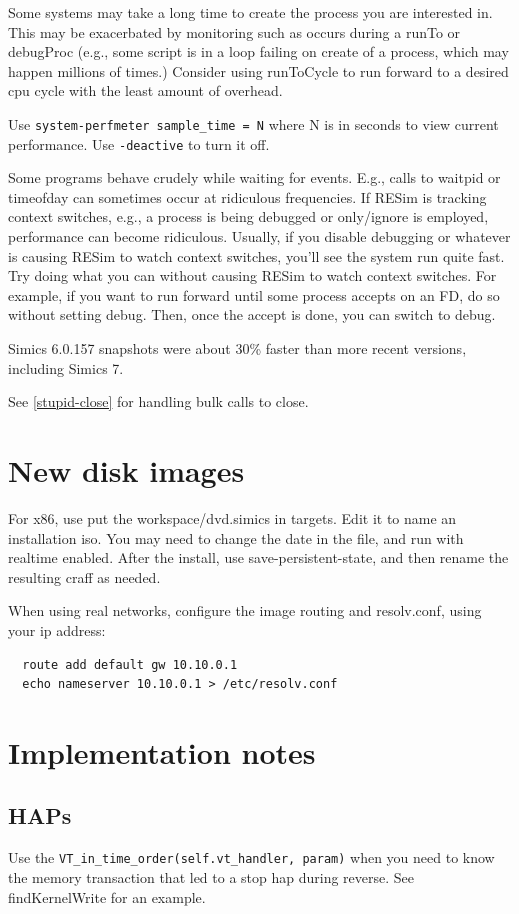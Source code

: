 \documentclass[titlepage]{article}
\begin{document}
\begin{appendices}
Some systems may take a long time to create the process you are interested in.  This may be exacerbated by monitoring such as occurs during
a runTo or debugProc (e.g., some script is in a loop failing on create of a process, which may happen millions of times.)  Consider using
runToCycle to run forward to a desired cpu cycle with the least amount of overhead.

Use {\tt system-perfmeter sample\_time = N} where N is in seconds to view current performance.  Use {\tt -deactive} to turn it off.

Some programs behave crudely while waiting for events.  E.g., calls to waitpid or timeofday can sometimes occur at ridiculous frequencies.
If RESim is tracking context switches, e.g., a process is being debugged or only/ignore is employed, performance can become ridiculous.
Usually, if you disable debugging or whatever is causing RESim to watch context switches, you'll see the system run quite fast.
Try doing what you can without causing RESim to watch context switches.  For example, if you want to run forward until some process accepts
on an FD, do so without setting debug.  Then, once the accept is done, you can switch to debug.

Simics 6.0.157 snapshots were about 30\% faster than more recent versions, including Simics 7.

See \ref{stupid-close} for handling bulk calls to close.

\section{New disk images}
For x86, use put the workspace/dvd.simics in targets.  Edit it to name an installation iso.  You may need to change the date in
the file, and run with realtime enabled.  After the install, use save-persistent-state, and then rename the resulting craff as
needed.

When using real networks, configure the image routing and resolv.conf, using your ip address:
\begin{verbatim}
  route add default gw 10.10.0.1
  echo nameserver 10.10.0.1 > /etc/resolv.conf
\end{verbatim}


\section{Implementation notes}
\subsection{HAPs}
Use the {\tt VT\_in\_time\_order(self.vt\_handler, param)} when you need to know the memory transaction that
led to a stop hap during reverse.  See findKernelWrite for an example.


\end{appendices}
\end{document}
